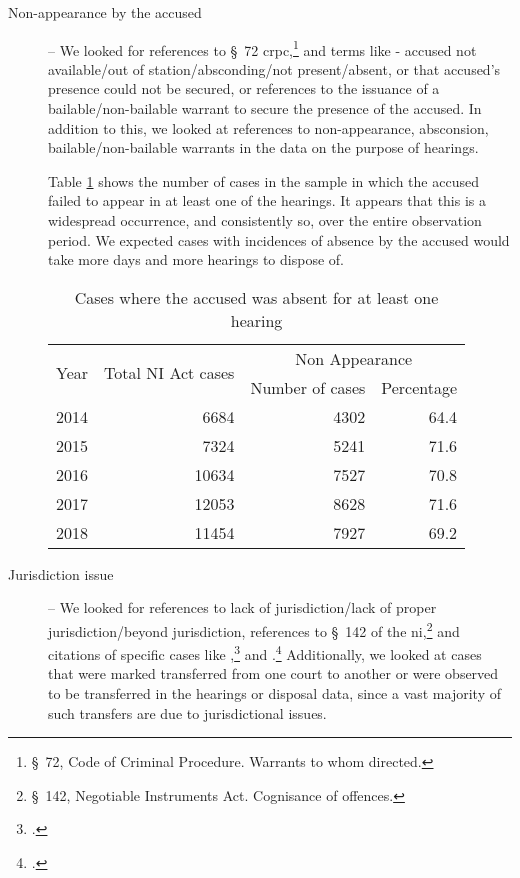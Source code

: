 \documentclass[12pt,a4paper]{article}
\begin{document}
	\begin{description}
		\item [Non-appearance by the accused] -- We looked for references to \S~72 \gls{crpc},\footnote{\S~72, Code of Criminal Procedure. Warrants to whom directed.} and terms like - accused not available/out of station/absconding/not present/absent, or that accused’s presence could not be secured, or references to the issuance of a bailable/non-bailable warrant to secure the presence of the accused. In addition to this, we looked at references to non-appearance, absconsion, bailable/non-bailable warrants in the data on the purpose of hearings. 
		
		Table \ref{tab:nonAppearance_yearWise} shows the number of cases in the sample in which the accused failed to appear in at least one of the hearings. It appears that this is a widespread occurrence, and consistently so, over the entire observation period. We expected cases with incidences of absence by the accused would take more days and more hearings to dispose of. 
		
		\begin{table}[!ht]
			\caption{Cases where the accused was absent for at least one hearing} \label{tab:nonAppearance_yearWise}
			\centering
			\footnotesize
			\begin{tabular}{lrrr}
				\toprule
				\multirow{2}{*}{Year} & \multirow{2}{*}{Total NI Act cases} & \multicolumn{2}{c}{Non Appearance}\\
				\cmidrule{3-4}
				&& Number of cases & Percentage \\
				\midrule %
				2014 & 6684 & 4302 & 64.4 \\
				2015 & 7324 & 5241 & 71.6 \\
				2016 & 10634 & 7527 & 70.8 \\
				2017 & 12053 & 8628 & 71.6 \\
				2018 & 11454 & 7927 & 69.2 \\
				\bottomrule
			\end{tabular}
			
		\end{table}
		
		\item[]
		
		\item [Jurisdiction issue] -- We looked for references to lack of jurisdiction/lack of proper jurisdiction/beyond jurisdiction, references to \S~142 of the \gls{ni},\footnote{\S~142, Negotiable Instruments Act. Cognisance of offences.} and citations of specific cases like ,\footcite{sc2014_dhanuka} and .\footcite{sc2016_carbon} Additionally, we looked at cases that were marked transferred from one court to another or were observed to be transferred in the hearings or disposal data, since a vast majority of such transfers are due to jurisdictional issues.
		

\end{description}
\end{document}
